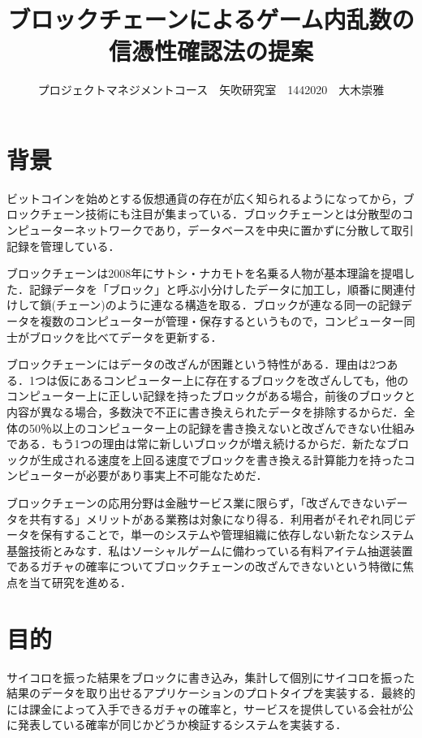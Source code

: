 \documentclass[uplatex,twocolumn,dvipdfmx]{jsarticle}
\title{\vspace{-5mm}\fontsize{14pt}{0pt}\selectfont ブロックチェーンによるゲーム内乱数の信憑性確認法の提案}
\author{\normalsize プロジェクトマネジメントコース　矢吹研究室　1442020　大木崇雅}
\date{}
\begin{document}
\fontsize{10.5pt}{\baselineskip}\selectfont
\maketitle





\section{背景}
ビットコインを始めとする仮想通貨の存在が広く知られるようになってから，ブロックチェーン技術にも注目が集まっている．ブロックチェーンとは分散型のコンピューターネットワークであり，データベースを中央に置かずに分散して取引記録を管理している\cite{a}．

ブロックチェーンは2008年にサトシ・ナカモトを名乗る人物が基本理論を提唱した．記録データを「ブロック」と呼ぶ小分けしたデータに加工し，順番に関連付けして鎖(チェーン)のように連なる構造を取る．ブロックが連なる同一の記録データを複数のコンピューターが管理・保存するというもので，コンピューター同士がブロックを比べてデータを更新する．

ブロックチェーンにはデータの改ざんが困難という特性がある．理由は2つある．1つは仮にあるコンピューター上に存在するブロックを改ざんしても，他のコンピューター上に正しい記録を持ったブロックがある場合，前後のブロックと内容が異なる場合，多数決で不正に書き換えられたデータを排除するからだ．全体の50％以上のコンピューター上の記録を書き換えないと改ざんできない仕組みである\cite{c}．もう1つの理由は常に新しいブロックが増え続けるからだ．新たなブロックが生成される速度を上回る速度でブロックを書き換える計算能力を持ったコンピューターが必要があり事実上不可能なためだ．

ブロックチェーンの応用分野は金融サービス業に限らず，「改ざんできないデータを共有する」メリットがある業務は対象になり得る．利用者がそれぞれ同じデータを保有することで，単一のシステムや管理組織に依存しない新たなシステム基盤技術とみなす．私はソーシャルゲームに備わっている有料アイテム抽選装置であるガチャの確率についてブロックチェーンの改ざんできないという特徴に焦点を当て研究を進める．



\section{目的}
サイコロを振った結果をブロックに書き込み，集計して個別にサイコロを振った結果のデータを取り出せるアプリケーションのプロトタイプを実装する．最終的には課金によって入手できるガチャの確率と，サービスを提供している会社が公に発表している確率が同じかどうか検証するシステムを実装する．
\end{document}
